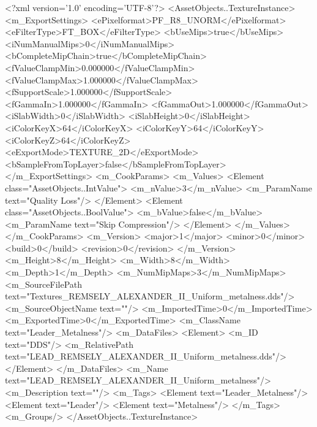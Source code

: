 <?xml version='1.0' encoding='UTF-8'?>
<AssetObjects..TextureInstance>
  <m_ExportSettings>
    <ePixelformat>PF_R8_UNORM</ePixelformat>
    <eFilterType>FT_BOX</eFilterType>
    <bUseMips>true</bUseMips>
    <iNumManualMips>0</iNumManualMips>
    <bCompleteMipChain>true</bCompleteMipChain>
    <fValueClampMin>0.000000</fValueClampMin>
    <fValueClampMax>1.000000</fValueClampMax>
    <fSupportScale>1.000000</fSupportScale>
    <fGammaIn>1.000000</fGammaIn>
    <fGammaOut>1.000000</fGammaOut>
    <iSlabWidth>0</iSlabWidth>
    <iSlabHeight>0</iSlabHeight>
    <iColorKeyX>64</iColorKeyX>
    <iColorKeyY>64</iColorKeyY>
    <iColorKeyZ>64</iColorKeyZ>
    <eExportMode>TEXTURE_2D</eExportMode>
    <bSampleFromTopLayer>false</bSampleFromTopLayer>
  </m_ExportSettings>
  <m_CookParams>
    <m_Values>
      <Element class="AssetObjects..IntValue">
        <m_nValue>3</m_nValue>
        <m_ParamName text="Quality Loss"/>
      </Element>
      <Element class="AssetObjects..BoolValue">
        <m_bValue>false</m_bValue>
        <m_ParamName text="Skip Compression"/>
      </Element>
    </m_Values>
  </m_CookParams>
  <m_Version>
    <major>1</major>
    <minor>0</minor>
    <build>0</build>
    <revision>0</revision>
  </m_Version>
  <m_Height>8</m_Height>
  <m_Width>8</m_Width>
  <m_Depth>1</m_Depth>
  <m_NumMipMaps>3</m_NumMipMaps>
  <m_SourceFilePath text="Textures\LEAD_REMSELY_ALEXANDER_II_Uniform_metalness.dds"/>
  <m_SourceObjectName text=""/>
  <m_ImportedTime>0</m_ImportedTime>
  <m_ExportedTime>0</m_ExportedTime>
  <m_ClassName text="Leader_Metalness"/>
  <m_DataFiles>
    <Element>
      <m_ID text="DDS"/>
      <m_RelativePath text="LEAD_REMSELY_ALEXANDER_II_Uniform_metalness.dds"/>
    </Element>
  </m_DataFiles>
  <m_Name text="LEAD_REMSELY_ALEXANDER_II_Uniform_metalness"/>
  <m_Description text=""/>
  <m_Tags>
    <Element text="Leader_Metalness"/>
    <Element text="Leader"/>
    <Element text="Metalness"/>
  </m_Tags>
  <m_Groups/>
</AssetObjects..TextureInstance>
